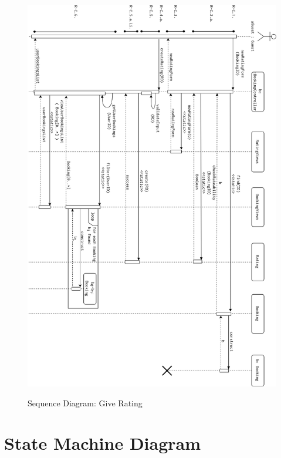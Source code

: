 \begin{figure}[H]
    \centering
    \includegraphics[width=16cm]{img/seq_diagrams/sqd_r_c.png} \\[0.5em]
    \caption{Sequence Diagram: Give Rating}
    \label{Sequence Diagram: Give Rating}
\end{figure}

\section{State Machine Diagram}\label{statemachine_section}

